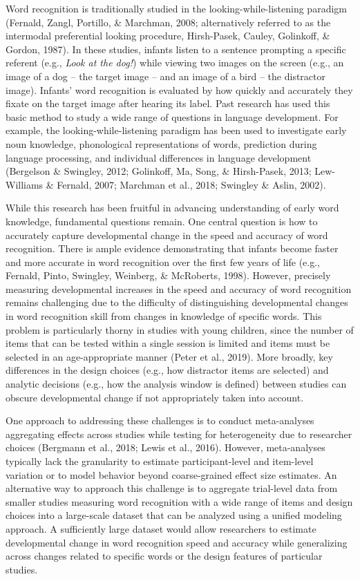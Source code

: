 \documentclass[
  english,
  man,floatsintext]{apa6}
\begin{document}
Word recognition is traditionally studied in the looking-while-listening paradigm (Fernald, Zangl, Portillo, \& Marchman, 2008; alternatively referred to as the intermodal preferential looking procedure, Hirsh-Pasek, Cauley, Golinkoff, \& Gordon, 1987).
In these studies, infants listen to a sentence prompting a specific referent (e.g., \emph{Look at the dog!}) while viewing two images on the screen (e.g., an image of a dog -- the target image -- and an image of a bird -- the distractor image).
Infants' word recognition is evaluated by how quickly and accurately they fixate on the target image after hearing its label.
Past research has used this basic method to study a wide range of questions in language development.
For example, the looking-while-listening paradigm has been used to investigate early noun knowledge, phonological representations of words, prediction during language processing, and individual differences in language development (Bergelson \& Swingley, 2012; Golinkoff, Ma, Song, \& Hirsh-Pasek, 2013; Lew-Williams \& Fernald, 2007; Marchman et al., 2018; Swingley \& Aslin, 2002).

While this research has been fruitful in advancing understanding of early word knowledge, fundamental questions remain.
One central question is how to accurately capture developmental change in the speed and accuracy of word recognition.
There is ample evidence demonstrating that infants become faster and more accurate in word recognition over the first few years of life (e.g., Fernald, Pinto, Swingley, Weinberg, \& McRoberts, 1998).
However, precisely measuring developmental increases in the speed and accuracy of word recognition remains challenging due to the difficulty of distinguishing developmental changes in word recognition skill from changes in knowledge of specific words.
This problem is particularly thorny in studies with young children, since the number of items that can be tested within a single session is limited and items must be selected in an age-appropriate manner (Peter et al., 2019).
More broadly, key differences in the design choices (e.g., how distractor items are selected) and analytic decisions (e.g., how the analysis window is defined) between studies can obscure developmental change if not appropriately taken into account.

One approach to addressing these challenges is to conduct meta-analyses aggregating effects across studies while testing for heterogeneity due to researcher choices (Bergmann et al., 2018; Lewis et al., 2016).
However, meta-analyses typically lack the granularity to estimate participant-level and item-level variation or to model behavior beyond coarse-grained effect size estimates.
An alternative way to approach this challenge is to aggregate trial-level data from smaller studies measuring word recognition with a wide range of items and design choices into a large-scale dataset that can be analyzed using a unified modeling approach.
A sufficiently large dataset would allow researchers to estimate developmental change in word recognition speed and accuracy while generalizing across changes related to specific words or the design features of particular studies.
\end{document}
